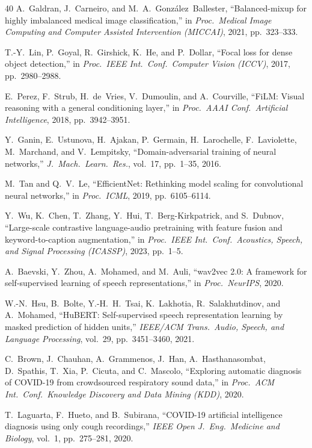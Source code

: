 \documentclass[10pt,journal,compsoc]{IEEEtran}
\begin{document}
\begin{thebibliography}{40}
A.~Galdran, J.~Carneiro, and M.~A.~Gonz\'{a}lez~Ballester,
``Balanced-mixup for highly imbalanced medical image classification,''
in \textit{Proc.\ Medical Image Computing and Computer Assisted
Intervention (MICCAI)}, 2021, pp.\ 323--333.

T.-Y.~Lin, P.~Goyal, R.~Girshick, K.~He, and P.~Dollar,
``Focal loss for dense object detection,''
in \textit{Proc.\ IEEE Int.\ Conf.\ Computer Vision (ICCV)}, 2017,
pp.\ 2980--2988.

E.~Perez, F.~Strub, H.~de~Vries, V.~Dumoulin, and A.~Courville,
``FiLM: Visual reasoning with a general conditioning layer,''
in \textit{Proc.\ AAAI Conf.\ Artificial Intelligence}, 2018,
pp.\ 3942--3951.

Y.~Ganin, E.~Ustunova, H.~Ajakan, P.~Germain, H.~Larochelle,
F.~Laviolette, M.~Marchand, and V.~Lempitsky,
``Domain-adversarial training of neural networks,''
\textit{J.\ Mach.\ Learn.\ Res.}, vol.\ 17, pp.\ 1--35, 2016.

M.~Tan and Q.~V.~Le,
``EfficientNet: Rethinking model scaling for convolutional neural networks,''
in \textit{Proc.\ ICML}, 2019, pp.\ 6105--6114.

Y.~Wu, K.~Chen, T.~Zhang, Y.~Hui, T.~Berg-Kirkpatrick, and S.~Dubnov,
``Large-scale contrastive language-audio pretraining with feature fusion
and keyword-to-caption augmentation,''
in \textit{Proc.\ IEEE Int.\ Conf.\ Acoustics, Speech, and Signal
Processing (ICASSP)}, 2023, pp.\ 1--5.

A.~Baevski, Y.~Zhou, A.~Mohamed, and M.~Auli,
``wav2vec 2.0: A framework for self-supervised learning of speech
representations,''
in \textit{Proc.\ NeurIPS}, 2020.

W.-N.~Hsu, B.~Bolte, Y.-H.~H.~Tsai, K.~Lakhotia, R.~Salakhutdinov,
and A.~Mohamed,
``HuBERT: Self-supervised speech representation learning by masked
prediction of hidden units,''
\textit{IEEE/ACM Trans.\ Audio, Speech, and Language Processing},
vol.\ 29, pp.\ 3451--3460, 2021.

C.~Brown, J.~Chauhan, A.~Grammenos, J.~Han, A.~Hasthanasombat,
D.~Spathis, T.~Xia, P.~Cicuta, and C.~Mascolo,
``Exploring automatic diagnosis of COVID-19 from crowdsourced respiratory
sound data,'' in \textit{Proc.\ ACM Int.\ Conf.\ Knowledge Discovery
and Data Mining (KDD)}, 2020.

T.~Laguarta, F.~Hueto, and B.~Subirana,
``COVID-19 artificial intelligence diagnosis using only cough recordings,''
\textit{IEEE Open J.\ Eng.\ Medicine and Biology}, vol.\ 1,
pp.\ 275--281, 2020.


\end{thebibliography}
\end{document}
